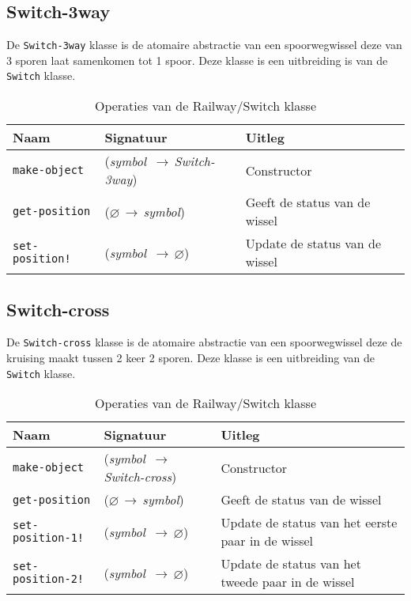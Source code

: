\documentclass[a4paper, 11pt]{article}
\newcommand{\naar}{\,$\rightarrow$\,}
\renewcommand{\empty}{$\varnothing$}
\newcommand{\<}{\scriptsize\textless\normalsize}
\renewcommand{\>}{\scriptsize\textgreater\normalsize}
\begin{document}
\newpage

\subsection{Switch-3way} %
De \texttt{Switch-3way} klasse is de atomaire abstractie van een spoorwegwissel deze van 3 sporen laat samenkomen tot 1 spoor. Deze klasse is een uitbreiding is van de \texttt{Switch} klasse.
\begin{table}[H]
	\begin{center}
		{
		\begin{tabular}{|l l l|}
			\hline
			\textbf{Naam} & \textbf{Signatuur} & \textbf{Uitleg}\\
			\hline
			\texttt{make-object} & (\textit{symbol} \naar \textit{Switch-3way}) & Constructor\\
			\hline
			\texttt{get-position} & (\empty \naar \textit{symbol}) & Geeft de status van de wissel\\
			\texttt{set-position!} & (\textit{symbol} \naar \empty) & Update de status van de wissel\\
			\hline
		\end{tabular}}
		\caption{Operaties van de Railway/Switch klasse}
	\end{center}
\end{table}

\subsection{Switch-cross} %
De \texttt{Switch-cross} klasse is de atomaire abstractie van een spoorwegwissel deze de kruising maakt tussen 2 keer 2 sporen. Deze klasse is een uitbreiding van de \texttt{Switch} klasse.
\begin{table}[H]
	\begin{center}
		{
		\begin{tabular}{|l l l|}
			\hline
			\textbf{Naam} & \textbf{Signatuur} & \textbf{Uitleg}\\
			\hline
			\texttt{make-object} & (\textit{symbol} \naar \textit{Switch-cross}) & Constructor\\
			\hline
			\texttt{get-position} & (\empty \naar \textit{symbol}) & Geeft de status van de wissel\\
			\texttt{set-position-1!} & (\textit{symbol} \naar \empty) & Update de status van het eerste paar in de wissel\\
			\texttt{set-position-2!} & (\textit{symbol} \naar \empty) & Update de status van het tweede paar in de wissel\\
			\hline
		\end{tabular}}
		\caption{Operaties van de Railway/Switch klasse}
	\end{center}
\end{table}
\end{document}
